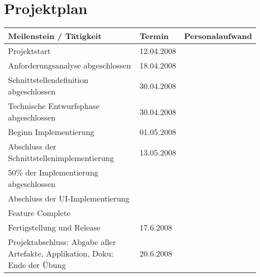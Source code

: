 

\section{Projektplan}
\begin{tabular}{ | p{6cm} | p{4cm} | l | }
\hline
\textbf{Meilenstein / Tätigkeit} & \textbf{Termin} & \textbf{Personalaufwand} \\
\hline
Projektstart & 12.04.2008 & \\
\hline
Anforderungsanalyse abgeschlossen & 18.04.2008 & \\
\hline
Schnittstellendefinition abgeschlossen  & 30.04.2008 & \\
\hline
Technische Entwurfsphase abgeschlossen & 30.04.2008 & \\
\hline
Beginn Implementierung & 01.05.2008 & \\
\hline
Abschluss der Schnittstellenimplementierung & 13.05.2008 & \\
\hline
50\% der Implementierung abgeschlossen & & \\
\hline 
Abschluss der UI-Implementierung & & \\
\hline
Feature Complete & & \\
\hline
Fertigstellung und Release & 17.6.2008 & \\
\hline
Projektabschluss: Abgabe aller Artefakte, Applikation, Doku; Ende der Übung& 20.6.2008 & \\
\hline
\end{tabular}

